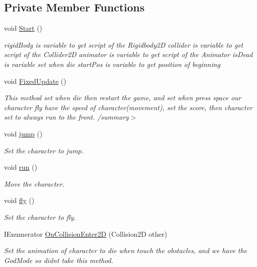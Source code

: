 \subsection*{Private Member Functions}
\begin{DoxyCompactItemize}
\item 
void \hyperlink{class_player_controller_ae1117d9c4da3193181cddad2c814e467}{Start} ()
\begin{DoxyCompactList}\small\item\em rigid\+Body is variable to get script of the Rigidbody2D collider is variable to get script of the Collider2D animator is variable to get script of the Animator is\+Dead is variable set when die start\+Pos is variable to get position of beginning \end{DoxyCompactList}\item 
\hypertarget{class_player_controller_ae5bdb1b48571f67c3f722a58b6f404d4}{}\label{class_player_controller_ae5bdb1b48571f67c3f722a58b6f404d4} 
void \hyperlink{class_player_controller_ae5bdb1b48571f67c3f722a58b6f404d4}{Fixed\+Update} ()
\begin{DoxyCompactList}\small\item\em This method set when die then restart the game, and set when press space our character fly have the speed of character(movement), set the score, then character set to always run to the front. /summary$>$ \end{DoxyCompactList}\item 
void \hyperlink{class_player_controller_a413e8e34033169093b21b38bf6bd0b34}{jump} ()
\begin{DoxyCompactList}\small\item\em Set the character to jump. \end{DoxyCompactList}\item 
void \hyperlink{class_player_controller_a3a495d7535b69bcc452118a4affcba4b}{run} ()
\begin{DoxyCompactList}\small\item\em Move the character. \end{DoxyCompactList}\item 
void \hyperlink{class_player_controller_aee6bf52d3f0ca89147606cccd433a59f}{fly} ()
\begin{DoxyCompactList}\small\item\em Set the character to fly. \end{DoxyCompactList}\item 
I\+Enumerator \hyperlink{class_player_controller_ab151f95651ed2108c880150f6c68e335}{On\+Collision\+Enter2D} (Collision2D other)
\begin{DoxyCompactList}\small\item\em Set the animation of character to die when touch the obstacles, and we have the God\+Mode so didn\textquotesingle{}t take this method. \end{DoxyCompactList}\end{DoxyCompactItemize}

